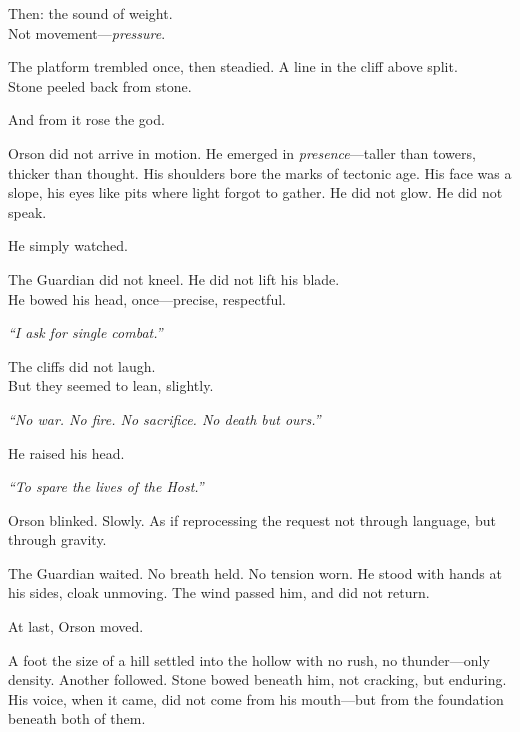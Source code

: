 \documentclass[12pt]{article}
\begin{document}
\vspace{0.5em}
Then: the sound of weight.\\
Not movement---\textit{pressure}.

\vspace{0.5em}
The platform trembled once, then steadied. A line in the cliff above split.\\
Stone peeled back from stone.

\vspace{0.5em}
And from it rose the god.

\vspace{0.5em}
Orson did not arrive in motion. He emerged in \textit{presence}---taller than towers, thicker than thought. His shoulders bore the marks of tectonic age. His face was a slope, his eyes like pits where light forgot to gather. He did not glow. He did not speak.

\vspace{0.5em}
He simply watched.

\vspace{0.5em}
The Guardian did not kneel. He did not lift his blade.\\
He bowed his head, once---precise, respectful.

\vspace{0.5em}
\textit{``I ask for single combat.''}

\vspace{0.5em}
The cliffs did not laugh.\\
But they seemed to lean, slightly.

\vspace{0.5em}
\textit{``No war. No fire. No sacrifice. No death but ours.''}

\vspace{0.5em}
He raised his head.

\vspace{0.5em}
\textit{``To spare the lives of the Host.''}

\vspace{0.5em}
Orson blinked. Slowly. As if reprocessing the request not through language, but through gravity.

\vspace{0.5em}
The Guardian waited. No breath held. No tension worn. He stood with hands at his sides, cloak unmoving. The wind passed him, and did not return.

\vspace{0.5em}
At last, Orson moved.

\vspace{0.5em}
A foot the size of a hill settled into the hollow with no rush, no thunder---only density. Another followed. Stone bowed beneath him, not cracking, but enduring. His voice, when it came, did not come from his mouth---but from the foundation beneath both of them.
\end{document}
